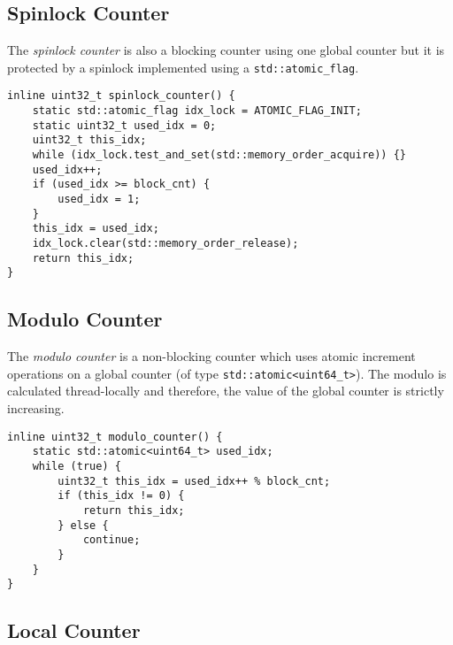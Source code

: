 \subsection[Spinlock Counter]{Spinlock Counter} \label{subsec:spinlock_counter}

    The \emph{spinlock counter} is also a blocking counter using one global counter but it is protected by a spinlock implemented using a \lstinline{std::atomic_flag}.

\begin{@empty}
    \lstset{
        language = [ISO]C++,
        style = basic
    }
    \begin{lstlisting}
inline uint32_t spinlock_counter() {
    static std::atomic_flag idx_lock = ATOMIC_FLAG_INIT;
    static uint32_t used_idx = 0;
    uint32_t this_idx;
    while (idx_lock.test_and_set(std::memory_order_acquire)) {}
    used_idx++;
    if (used_idx >= block_cnt) {
        used_idx = 1;
    }
    this_idx = used_idx;
    idx_lock.clear(std::memory_order_release);
    return this_idx;
}
    \end{lstlisting}
\end{@empty}

\subsection[Modulo Counter]{Modulo Counter} \label{subsec:modulo_counter}

    The \emph{modulo counter} is a non-blocking counter which uses atomic increment operations on a global counter (of type \lstinline{std::atomic<uint64_t>}). The modulo is calculated thread-locally and therefore, the value of the global counter is strictly increasing.

\begin{@empty}
    \lstset{
        language = [ISO]C++,
        style = basic
    }
    \begin{lstlisting}
inline uint32_t modulo_counter() {
    static std::atomic<uint64_t> used_idx;
    while (true) {
        uint32_t this_idx = used_idx++ % block_cnt;
        if (this_idx != 0) {
            return this_idx;
        } else {
            continue;
        }
    }
}
    \end{lstlisting}
\end{@empty}

\subsection[Local Counter]{Local Counter} \label{subsec:local_counter}

